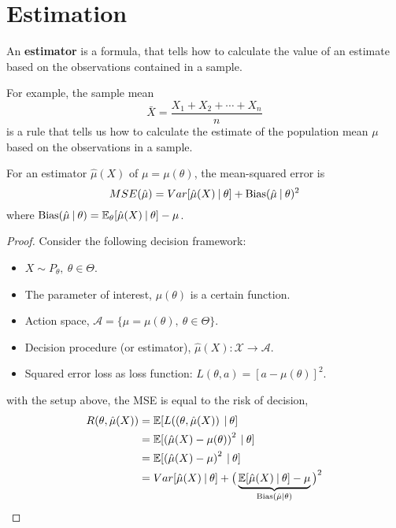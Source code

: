 \chapter{Estimation}

\begin{definition}[Estimator]
    An \textbf{estimator} is a formula, that tells 
    how to calculate the value of an estimate based 
    on the observations contained in a sample.
\end{definition}

For example, the sample mean 
\[
    \bar{X} = \frac{X_1 + X_2 + \cdots + X_n}{n}
\]
is a rule that tells us how to calculate the estimate of the population mean $\mu$ based on the observations in a sample.

\begin{theorem}
    For an estimator $\hat{\mu}(X)$ of $\mu = \mu(\theta)$, the mean-squared error is 
    \begin{equation}
        MSE(\hat{\mu}) = Var[\hat{\mu}(X) \> | \> \theta] + \operatorname*{Bias}(\hat{\mu} \> | \> \theta)^2
    \end{equation}
    where $\operatorname*{Bias} (\hat{\mu} \> | \> \theta) = \mathbb{E}_\theta [\hat{\mu}(X) \> | \> \theta] - \mu$.
\end{theorem}
\begin{proof}
    Consider the following decision framework:
    \begin{itemize}
        \item $X \sim P_\theta,\> \theta \in \Theta$.
        \item The parameter of interest, $\mu(\theta)$ is a certain function.
        \item Action space, $\mathcal{A} = \{ \mu = \mu(\theta), \> \theta \in \Theta \}$.
        \item Decision procedure (or estimator), $\hat{\mu}(X) : \mathcal{X} \to \mathcal{A}$.
        \item Squared error loss as loss function: $L(\theta, a) = [a - \mu(\theta)]^2$.
    \end{itemize}
    with the setup above, the MSE is equal to the risk of decision,
    \begin{align*}
        R(\theta, \hat{\mu}(X)) &= \mathbb{E}[L(\left(\theta, \hat{\mu}(X) \right) \> | \> \theta]\\
        &= \mathbb{E}[\left(\hat{\mu}(X) - \mu(\theta) \right)^2 \> | \> \theta]\\
        &= \mathbb{E}[\left(\hat{\mu}(X) - \mu \right)^2 \> | \> \theta]\\
        &= Var[\hat{\mu}(X) \> | \> \theta] + 
            \big(\underbrace{\mathbb{E}[\hat{\mu}(X) \> | \> \theta] - \mu}_{\operatorname*{Bias}(\hat{\mu} | \theta)} \big)^2
    \end{align*}
\end{proof}

